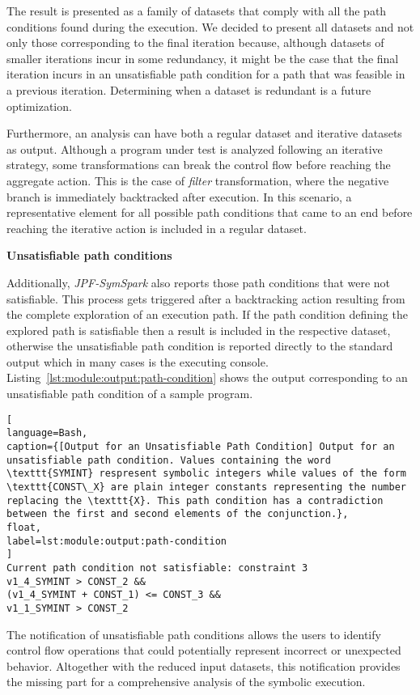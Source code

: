 The result is presented as a family of datasets that comply with all the path conditions found during the execution. We decided to present all datasets and not only those corresponding to the final iteration because, although datasets of smaller iterations incur in some redundancy, it might be the case that the final iteration incurs in an unsatisfiable path condition for a path that was feasible in a previous iteration. Determining when a dataset is redundant is a future optimization.

Furthermore, an analysis can have both a regular dataset and iterative datasets as output. Although a program under test is analyzed following an iterative strategy, some transformations can break the control flow before reaching the aggregate action. This is the case of \textit{filter} transformation, where the negative branch is immediately backtracked after execution. In this scenario, a representative element for all possible path conditions that came to an end before reaching the iterative action is included in a regular dataset.

\textbf{Unsatisfiable path conditions}

Additionally, \textit{JPF-SymSpark} also reports those path conditions that were not satisfiable. This process gets triggered after a backtracking action resulting from the complete exploration of an execution path. If the path condition defining the explored path is satisfiable then a result is included in the respective dataset, otherwise the unsatisfiable path condition is reported directly to the standard output which in many cases is the executing console. Listing~\ref{lst:module:output:path-condition} shows the output corresponding to an unsatisfiable path condition of a sample program.

\begin{lstlisting}[
language=Bash,
caption={[Output for an Unsatisfiable Path Condition] Output for an unsatisfiable path condition. Values containing the word \texttt{SYMINT} respresent symbolic integers while values of the form \texttt{CONST\_X} are plain integer constants representing the number replacing the \texttt{X}. This path condition has a contradiction between the first and second elements of the conjunction.},
float,
label=lst:module:output:path-condition
]
Current path condition not satisfiable: constraint 3
v1_4_SYMINT > CONST_2 &&
(v1_4_SYMINT + CONST_1) <= CONST_3 &&
v1_1_SYMINT > CONST_2
\end{lstlisting}

The notification of unsatisfiable path conditions allows the users to identify control flow operations that could potentially represent incorrect or unexpected behavior. Altogether with the reduced input datasets, this notification provides the missing part for a comprehensive analysis of the symbolic execution.